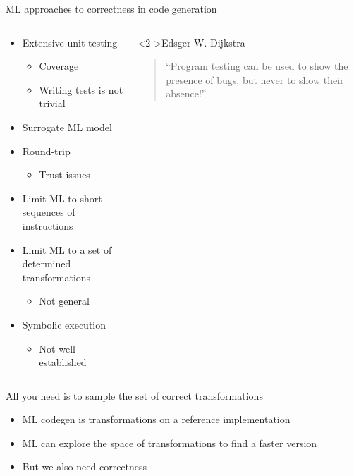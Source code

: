\documentclass[presentation, aspectratio=169]{beamer}
\begin{document}
\begin{frame}[label={sec:org73d51f3}]{ML approaches to correctness in code generation}
\begin{columns}
\begin{column}{0.45\columnwidth}
\begin{itemize}
\item <1-> Extensive unit testing
\begin{itemize}
\item Coverage
\item Writing tests is not trivial
\end{itemize}
\item <3-> Surrogate ML model
\item <3-> Round-trip
\begin{itemize}
\item Trust issues
\end{itemize}
\item <4-> Limit ML to short sequences of instructions
\item <4-> Limit ML to a set of determined transformations
\begin{itemize}
\item Not general
\end{itemize}
\item <5-> Symbolic execution
\begin{itemize}
\item Not well established
\end{itemize}
\end{itemize}
\end{column}
\begin{column}{0.45\columnwidth}
\begin{block}<2->{Edsger W. Dijkstra}
\begin{quote}
``Program testing can be used to show the presence of bugs, but never to show their absence!''
\end{quote}
\end{block}
\end{column}
\end{columns}
\end{frame}
\begin{frame}[label={sec:org97b75b4}]{All you need is to sample the set of correct transformations}
\begin{itemize}
\item <+-> \alert{ML codegen is transformations} on a reference implementation
\item <+-> ML can \alert{explore the space of transformations} to find a faster version
\item <+-> But we also need \alert{correctness}
\end{itemize}
\end{frame}
\end{document}
